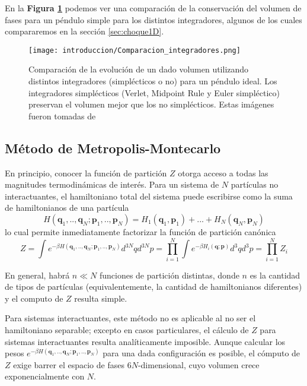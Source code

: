 En la \textbf{Figura \ref{fig:comp_integ_gatito}} podemos ver una comparación de la conservación del volumen de fases para un péndulo simple para los distintos integradores, algunos de los cuales 
compararemos en la sección \ref{sec:choque1D}.

\begin{figure}[H]
	\centering	%
	\texttt{[image: introduccion/Comparacion\_integradores.png]}
	\caption{Comparación de la evolución de un dado volumen utilizando distintos integradores (simplécticos o no) para un péndulo ideal.
		Los integradores simplécticos (Verlet, Midpoint Rule y Euler simpléctico) preservan el volumen mejor que los no simplécticos.
		Estas imágenes fueron tomadas de \cite[pp. 188]{BOOK:SPR_INT}}
	\label{fig:comp_integ_gatito}
\end{figure}

\subsection{Método de Metropolis-Montecarlo}

En principio, conocer la función de partición $Z$ otorga acceso a todas las magnitudes termodinámicas de interés.
Para un sistema de $N$ partículas no interactuantes, el hamiltoniano total del sistema puede escribirse como la suma de hamiltonianos de una partícula
\[H(\mathbf{q}_1,..,\mathbf{q}_N;\mathbf{p}_1,..,\mathbf{p}_N) = H_1(\mathbf{q}_1, \mathbf{p}_1) + ... +H_N(\mathbf{q}_N, \mathbf{p}_N)\]
lo cual permite inmediatamente factorizar la función de partición canónica
\[ Z = \int e^{-\beta H(\mathbf{q}_1,..,\mathbf{q}_N;\mathbf{p}_1,..,\mathbf{p}_N)} d^{3N}qd^{3N}p = \prod_{i=1}^N \int e^{-\beta H_i(\mathbf{q};\mathbf{p})} d^{3}qd^{3}p = \prod_{i=1}^N Z_i \]

En general, habrá $n\ll N$ funciones de partición distintas, donde $n$ es la cantidad de tipos de partículas (equivalentemente, la cantidad de hamiltonianos diferentes) y el computo de $Z$ resulta simple.

Para sistemas interactuantes, este método no es aplicable al no ser el hamiltoniano separable; excepto en casos particulares, el cálculo de $Z$ para sistemas interactuantes resulta analíticamente imposible.
Aunque calcular los pesos $e^{-\beta H(\mathbf{q}_1,..,\mathbf{q}_N;\mathbf{p}_1,..,\mathbf{p}_N)}$ para una dada configuración es posible, el cómputo de $Z$ exige barrer el espacio de fases $6N$-dimensional,
cuyo volumen crece exponencialmente con $N$.

